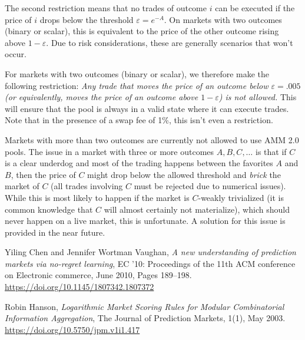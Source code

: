 \documentclass[12pt]{article}
\begin{document}
The second restriction means that no trades of outcome $i$ can be executed if the price of $i$ drops below the threshold $\varepsilon = e^{-A}$. On markets with two outcomes (binary or scalar), this is equivalent to the price of the other outcome rising above $1 - \varepsilon$. Due to risk considerations, these are generally scenarios that won't occur.

For markets with two outcomes (binary or scalar), we therefore make the following restriction: \emph{Any trade that moves the price of an outcome below $\varepsilon = .005$ (or equivalently, moves the price of an outcome above $1 - \varepsilon$) is not allowed.} This will ensure that the pool is always in a valid state where it can execute trades. Note that in the presence of a swap fee of 1\%, this isn't even a restriction.

Markets with more than two outcomes are currently not allowed to use AMM 2.0 pools. The issue in a market with three or more outcomes $A, B, C, \ldots$ is that if $C$ is a clear underdog and most of the trading happens between the favorites $A$ and $B$, then the price of $C$ might drop below the allowed threshold and \emph{brick} the market of $C$ (all trades involving $C$ must be rejected due to numerical issues). While this is most likely to happen if the market is $C$-weakly trivialized (it is common knowledge that $C$ will almost certainly not materialize), which should never happen on a live market, this is unfortunate. A solution for this issue is provided in the near future.

\newpage

\begin{thebibliography}{9}
      Yiling Chen and Jennifer Wortman Vaughan,
      \emph{A new understanding of prediction markets via no-regret learning},
      EC '10: Proceedings of the 11th ACM conference on Electronic commerce,
      June 2010, Pages 189–198.
      \url{https://doi.org/10.1145/1807342.1807372}

      Robin Hanson,
      \emph{Logarithmic Market Scoring Rules for Modular Combinatorial Information Aggregation},
      The Journal of Prediction Markets, 1(1),
      May 2003.
      \url{https://doi.org/10.5750/jpm.v1i1.417}
\end{thebibliography}
\end{document}

